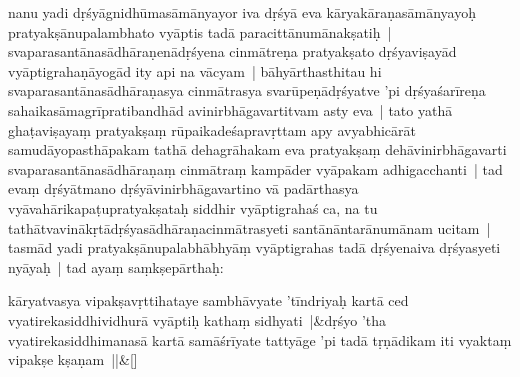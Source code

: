 \documentclass[article,12pt,a4paper]{memoir}%
\newcounter{parCount}
\begin{document}
	  
	  \pstart \leavevmode%
	\label{thakur75-45.13}nanu yadi dṛśyāgnidhūmasāmānyayor iva \label{ratnakīrtinibandhāvali__36r1PF7IMVW9VQKNUGR24RY6CLM}dṛśyā\label{ratnakīrtinibandhāvali__36r1PF7IMVVGFNWYPOLMDXQ8LLU} eva kāryakāraṇasāmānyayoḥ pratyakṣānupalambhato vyāptis tadā paracittānumānakṣatiḥ | svaparasantānasādhāra\label{ratnakīrtinibandhāvali__36r1PF7IMVUOL26OEJJYFE6B0AJ}ṇenādṛśyena\label{ratnakīrtinibandhāvali__36r1PF7IMVTV691SZ12AAL1XY0F} cinmātreṇa pratyakṣato dṛśyaviṣayād \label{ratnakīrtinibandhāvali__36r1PF7IMVSW4O6482CUH1BZRR4}vyāptigrahaṇāyogād ity api na vācyam | bāhyārthasthitau hi svaparasantānasādhāraṇasya cinmātrasya svarūpeṇādṛśyatve 'pi dṛśyaśarīreṇa sahaikasāmagrīpratibandhād avinirbhāgavartitvam asty eva | tato yathā ghaṭaviṣayaṃ pratyakṣaṃ rūpaikadeśapravṛttam apy avyabhicārāt samudāyopasthāpakam tathā dehagrāhakam eva pratyakṣaṃ dehāvinirbhāgavarti svaparasantānasādhāraṇaṃ cinmātraṃ kampāder vyāpakam adhigacchanti | tad evaṃ dṛśyātmano dṛśyāvinirbhāgavartino vā padārthasya vyāvahārikapaṭupratyakṣataḥ siddhir vyāptigrahaś ca, na tu tathātvavinākṛtādṛśyasādhāraṇacinmātrasyeti santānāntarānumānam ucitam | tasmād yadi pratyakṣānupalabhābhyāṃ vyāptigrahas tadā dṛśyenaiva dṛśyasyeti nyāyaḥ | \label{thakur75-45.24} tad ayaṃ saṃkṣepārthaḥ:
	{}
	\pend%
      
	    
	    \stanza[\smallbreak]
	  kāryatvasya vipakṣavṛttihataye sambhāvyate 'tīndriyaḥ kartā ced vyatirekasiddhividhurā vyāptiḥ kathaṃ sidhyati |&dṛśyo 'tha vyatirekasiddhimanasā kartā samāśrīyate tattyāge 'pi tadā tṛṇādikam iti vyaktaṃ vipakṣe kṣaṇam ||\&[\smallbreak]
	  
\end{document}
